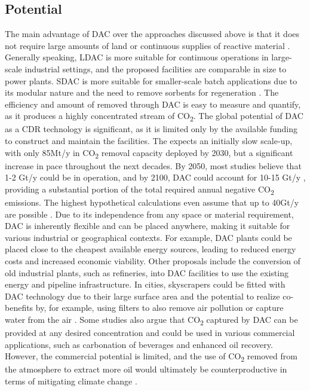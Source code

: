 \subsection*{Potential}
The main advantage of DAC over the approaches discussed above is that it does not require large amounts of land or continuous supplies of reactive material \parencite{Mulligan2020CarbonShot:States, IEA2022DirectZero}.
Generally speaking, LDAC is more suitable for continuous operations in large-scale industrial settings, and the proposed facilities are comparable in size to power plants. SDAC is more suitable for smaller-scale batch applications due to its modular nature and the need to remove sorbents for regeneration \parencite[22-23]{IEA2022DirectZero}. The efficiency and amount of \parencite{Mulligan2020CarbonShot:States, IEA2022DirectZero} removed through DAC is easy to measure and quantify, as it produces a highly concentrated stream of CO\textsubscript{2}.
The global potential of DAC as a CDR technology is significant, as it is limited only by the available funding to construct and maintain the facilities. The \textcite{IEA2022DirectZero} expects an initially slow scale-up, with only 85Mt/y in CO\textsubscript{2} removal capacity deployed by 2030, but a significant increase in pace throughout the next decades. By 2050, most studies believe that 1-2 Gt/y could be in operation, and by 2100, DAC could account for 10-15 Gt/y \parencite{Mulligan2020CarbonShot:States, IEA2022DirectZero}, providing a substantial portion of the total required annual negative CO\textsubscript{2} emissions. The highest hypothetical calculations even assume that up to 40Gt/y are possible \parencite{Fuss2018NegativeEffects}.
Due to its independence from any space or material requirement, DAC is inherently flexible and can be placed anywhere, making it suitable for various industrial or geographical contexts. For example, DAC plants could be placed close to the cheapest available energy sources, leading to reduced energy costs and increased economic viability. Other proposals include the conversion of old industrial plants, such as refineries, into DAC facilities to use the existing energy and pipeline infrastructure. In cities, skyscrapers could be fitted with DAC technology due to their large surface area and the potential to realize co-benefits by, for example, using filters to also remove air pollution or capture water from the air \parencite{Lawler2022WhatTechnology}. Some studies also argue that CO\textsubscript{2} captured by DAC can be provided at any desired concentration and could be used in various commercial applications, such as carbonation of beverages and enhanced oil recovery. However, the commercial potential is limited, and the use of CO\textsubscript{2} removed from the atmosphere to extract more oil would ultimately be counterproductive in terms of mitigating climate change \parencite{Erans2022DirectChallenges}.

